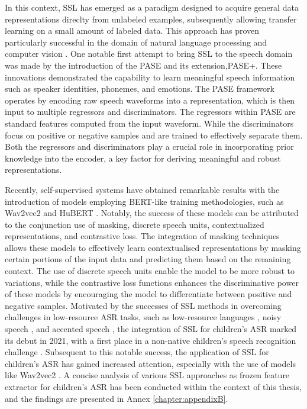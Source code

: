 In this context, \ac{SSL} has emerged as a paradigm designed to acquire general data representations direclty from unlabeled examples, subsequently allowing transfer learning on a small amount of labeled data. This approach has proven particularly successful in the domain of natural language processing \cite{sarzynska2021detecting} and computer vision \cite{henaff2020data}.
One notable first attempt to bring \ac{SSL} to the speech domain was made by the introduction of the \ac{PASE} and its extension,\ac{PASE}+. These innovations demonstrated the capability to learn meaningful speech information such as speaker identities, phonemes, and emotions. The \ac{PASE} framework operates by encoding raw speech waveforms into a representation, which is then input to multiple regressors and discriminators. The regressors within \ac{PASE} are standard features computed from the input waveform. While the discriminators focus on positive or negative samples and are trained to effectively separate them. Both the regressors and discriminators play a crucial role in incorporating prior knowledge into the encoder, a key factor for deriving meaningful and robust representations. 

Recently, self-supervised systems have obtained remarkable results with the introduction of models employing \ac{BERT}-like training methodologies, such as Wav2vec2 \cite{baevski2020wav2vec} and HuBERT \cite{hsu2021hubert}. Notably, the success of these models can be attributed to the conjunction use of masking, discrete speech units, contextualized representations, and contrastive loss. The integration of masking techniques allows these models to effectively learn contextualised representations by masking certain portions of the input data and predicting them based on the remaining context. The use of discrete speech units enable the model to be more robust to variations, while the contrastive loss functions enhances the discriminative power of these models by encouraging the model to differentiate between positive and negative samples.
Motivated by the successes of \ac{SSL} methods in overcoming challenges in low-resource \ac{ASR} tasks, such as low-resource languages \cite{riviere2020unsupervised}, noisy speech \cite{wang2022wav2vec}, and accented speech \cite{li2021accent}, the integration of \ac{SSL} for children's \ac{ASR} marked its debut in 2021, with a first place in a non-native children's speech recognition challenge \cite{xu2021tal}. Subsequent to this notable success, the application of \ac{SSL} for children's \ac{ASR} has gained increased attention, especially with the use of models like Wav2vec2 \cite{jain2023wav2vec2,jain2023adaptation,fan2022draft}. A concise analysis of various \ac{SSL} approaches as frozen feature extractor for children's \ac{ASR} has been conducted within the context of this thesis, and the findings are presented in Annex \ref{chapter:appendixB}.
   
